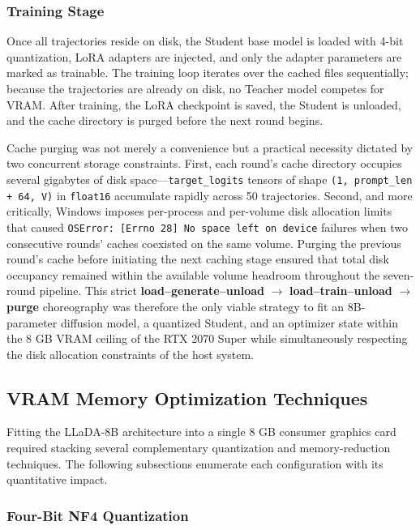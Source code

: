 \documentclass[11pt, a4paper]{article}
\begin{document}
\subsubsection{Training Stage}

Once all trajectories reside on disk, the Student base model is loaded with 4-bit quantization, LoRA adapters are injected, and only the adapter parameters are marked as trainable. The training loop iterates over the cached files sequentially; because the trajectories are already on disk, no Teacher model competes for VRAM. After training, the LoRA checkpoint is saved, the Student is unloaded, and the cache directory is purged before the next round begins.

Cache purging was not merely a convenience but a practical necessity dictated by two concurrent storage constraints. First, each round's cache directory occupies several gigabytes of disk space---\texttt{target\_logits} tensors of shape \texttt{(1, prompt\_len + 64, V)} in \texttt{float16} accumulate rapidly across 50 trajectories. Second, and more critically, Windows imposes per-process and per-volume disk allocation limits that caused \texttt{OSError: [Errno 28] No space left on device} failures when two consecutive rounds' caches coexisted on the same volume. Purging the previous round's cache before initiating the next caching stage ensured that total disk occupancy remained within the available volume headroom throughout the seven-round pipeline. This strict \textbf{load--generate--unload} $\to$ \textbf{load--train--unload} $\to$ \textbf{purge} choreography was therefore the only viable strategy to fit an 8B-parameter diffusion model, a quantized Student, and an optimizer state within the 8 GB VRAM ceiling of the RTX 2070 Super while simultaneously respecting the disk allocation constraints of the host system.

\subsection{VRAM Memory Optimization Techniques}
\label{subsec:vram_opt}

Fitting the LLaDA-8B architecture into a single 8 GB consumer graphics card required stacking several complementary quantization and memory-reduction techniques. The following subsections enumerate each configuration with its quantitative impact.

\subsubsection{Four-Bit NF4 Quantization}
\end{document}
